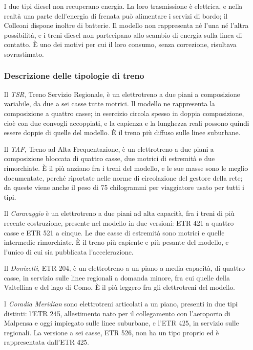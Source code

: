 I due tipi diesel non recuperano energia. La loro trasmissione è elettrica, e nella realtà una parte dell'energia di frenata può alimentare i servizi di bordo; il Colleoni dispone inoltre di batterie. Il modello non rappresenta né l'una né l'altra possibilità, e i treni diesel non partecipano allo scambio di energia sulla linea di contatto. È uno dei motivi per cui il loro consumo, senza correzione, risultava sovrastimato.

\subsubsection{Descrizione delle tipologie di treno}
Il \textit{TSR}, Treno Servizio Regionale, è un elettrotreno a due piani a composizione variabile, da due a sei casse tutte motrici. Il modello ne rappresenta la composizione a quattro casse; in esercizio circola spesso in doppia composizione, cioè con due convogli accoppiati, e la capienza e la lunghezza reali possono quindi essere doppie di quelle del modello. È il treno più diffuso sulle linee suburbane.

Il \textit{TAF}, Treno ad Alta Frequentazione, è un elettrotreno a due piani a composizione bloccata di quattro casse, due motrici di estremità e due rimorchiate. È il più anziano fra i treni del modello, e le sue masse sono le meglio documentate, perché riportate nelle norme di circolazione del gestore della rete; da queste viene anche il peso di 75 chilogrammi per viaggiatore usato per tutti i tipi.

Il \textit{Caravaggio} è un elettrotreno a due piani ad alta capacità, fra i treni di più recente costruzione, presente nel modello in due versioni: ETR 421 a quattro casse e ETR 521 a cinque. Le due casse di estremità sono motrici e quelle intermedie rimorchiate. È il treno più capiente e più pesante del modello, e l'unico di cui sia pubblicata l'accelerazione.

Il \textit{Donizetti}, ETR 204, è un elettrotreno a un piano a media capacità, di quattro casse, in servizio sulle linee regionali a domanda minore, fra cui quelle della Valtellina e del lago di Como. È il più leggero fra gli elettrotreni del modello.

I \textit{Coradia Meridian} sono elettrotreni articolati a un piano, presenti in due tipi distinti: l'ETR 245, allestimento nato per il collegamento con l'aeroporto di Malpensa e oggi impiegato sulle linee suburbane, e l'ETR 425, in servizio sulle regionali. La versione a sei casse, ETR 526, non ha un tipo proprio ed è rappresentata dall'ETR 425.

